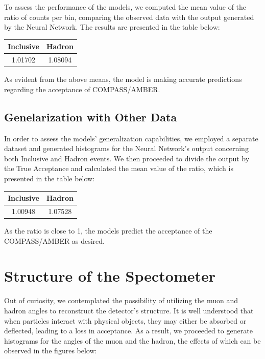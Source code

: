 \documentclass[EPJ,twocolumn]{webofc}
\begin{document}
To assess the performance of the models, we computed the mean value of the ratio of counts per bin, comparing the observed data with the output generated by the Neural Network.
The results are presented in the table below:

\begin{table}[H]
    \centering
    \begin{tabular}{c|c}
    \textbf{Inclusive} & \textbf{Hadron} \\ \hline
    1.01702 & 1.08094 \\
    \end{tabular}
\end{table}


As evident from the above means, the model is making accurate predictions regarding the acceptance of COMPASS/AMBER.


\subsection{Genelarization with Other Data}
In order to assess the models' generalization capabilities, we employed a separate dataset and generated histograms for the Neural Network's output concerning both Inclusive and Hadron events.
We then proceeded to divide the output by the True Acceptance and calculated the mean value of the ratio, which is presented in the table below:

\begin{table}[H]
    \centering
    \begin{tabular}{c|c}
    \textbf{Inclusive} & \textbf{Hadron} \\ \hline
    1.00948 & 1.07528 \\ 
    \end{tabular}
\end{table}

As the ratio is close to 1, the models predict the acceptance of the COMPASS/AMBER as desired.

\section{Structure of the Spectometer}
Out of curiosity, we contemplated the possibility of utilizing the muon and hadron angles to reconstruct the detector's structure. It is well understood that when particles interact with physical objects, they may either be absorbed or deflected, leading to a loss in acceptance. As a result, we proceeded to generate histograms for the angles of the muon and the hadron, the effects of which can be observed in the figures below:
\end{document}
